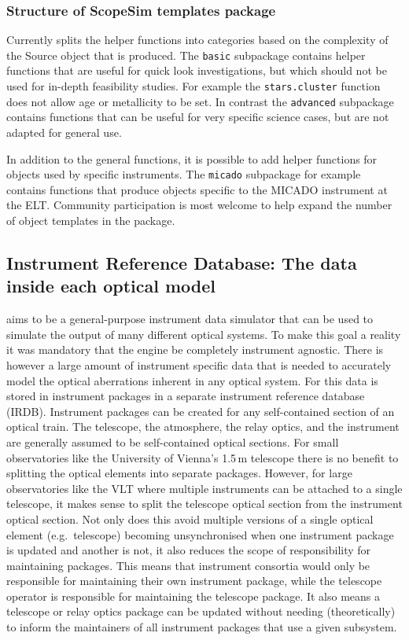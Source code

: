 \subsubsection{Structure of ScopeSim templates package}
\label{structure-of-scopesim-templates-package}


Currently \ScopeSimtemplates{} splits the helper functions into categories based on the complexity of the Source object that is produced.
The \lstinline{basic} subpackage contains helper functions that are useful for quick look investigations, but which should not be used for in-depth feasibility studies.
For example the \lstinline{stars.cluster} function does not allow age or metallicity to be set.
In contrast the \lstinline{advanced} subpackage contains functions that can be useful for very specific science cases, but are not adapted for general use.

In addition to the general functions, it is possible to add helper functions for objects used by specific instruments.
The \lstinline{micado} subpackage for example contains functions that produce objects specific to the MICADO instrument at the ELT.
Community participation is most welcome to help expand the number of object templates in the \ScopeSimtemplates{} package.


\subsection{Instrument Reference Database: The data inside each optical model}
\label{instrument-reference-database-the-optical-model-data}

\ScopeSim{} aims to be a general-purpose instrument data simulator that can be used to simulate the output of many different optical systems.
To make this goal a reality it was mandatory that the \scopesim{} engine be completely instrument agnostic.
There is however a large amount of instrument specific data that is needed to accurately model the optical aberrations inherent in any optical system.
For \ScopeSim{} this data is stored in instrument packages in a separate instrument reference database (IRDB).
Instrument packages can be created for any self-contained section of an optical train.
The telescope, the atmosphere, the relay optics, and the instrument are generally assumed to be self-contained optical sections.
For small observatories like the University of Vienna's 1.5\,m telescope there is no benefit to splitting the optical elements into separate packages.
However, for large observatories like the VLT where multiple instruments can be attached to a single telescope, it makes sense to split the telescope optical section from the instrument optical section.
Not only does this avoid multiple versions of a single optical element (e.g.~telescope) becoming unsynchronised when one instrument package is updated and another is not, it also reduces the scope of responsibility for maintaining packages.
This means that instrument consortia would only be responsible for maintaining their own instrument package, while the telescope operator is responsible for maintaining the telescope package.
It also means a telescope or relay optics package can be updated without needing (theoretically) to inform the maintainers of all instrument packages that use a given subsystem.


